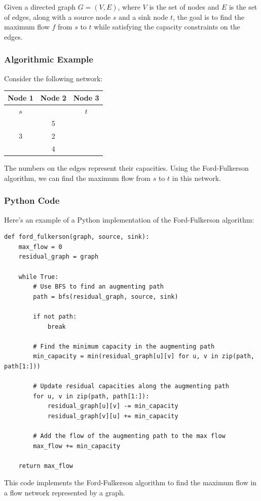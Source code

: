 \documentclass[12pt]{book} %
\begin{document}
Given a directed graph \( G = (V, E) \), where \( V \) is the set of nodes and \( E \) is the set of edges, along with a source node \( s \) and a sink node \( t \), the goal is to find the maximum flow \( f \) from \( s \) to \( t \) while satisfying the capacity constraints on the edges.

\subsubsection{Algorithmic Example}
Consider the following network:

\begin{center}
\begin{tabular}{ c c c }
    \textbf{Node 1} & \textbf{Node 2} & \textbf{Node 3} \\
    \hline
    $s$ & & $t$ \\
    & 5 & \\
    3 & 2 & \\
    & 4 & \\
\end{tabular}
\end{center}

The numbers on the edges represent their capacities. Using the Ford-Fulkerson algorithm, we can find the maximum flow from \( s \) to \( t \) in this network.

\subsubsection{Python Code}
Here's an example of a Python implementation of the Ford-Fulkerson algorithm:

\begin{lstlisting}
def ford_fulkerson(graph, source, sink):
    max_flow = 0
    residual_graph = graph
    
    while True:
        # Use BFS to find an augmenting path
        path = bfs(residual_graph, source, sink)
        
        if not path:
            break
        
        # Find the minimum capacity in the augmenting path
        min_capacity = min(residual_graph[u][v] for u, v in zip(path, path[1:]))
        
        # Update residual capacities along the augmenting path
        for u, v in zip(path, path[1:]):
            residual_graph[u][v] -= min_capacity
            residual_graph[v][u] += min_capacity
        
        # Add the flow of the augmenting path to the max flow
        max_flow += min_capacity
    
    return max_flow
\end{lstlisting}
\FloatBarrier
This code implements the Ford-Fulkerson algorithm to find the maximum flow in a flow network represented by a graph.
\end{document}
